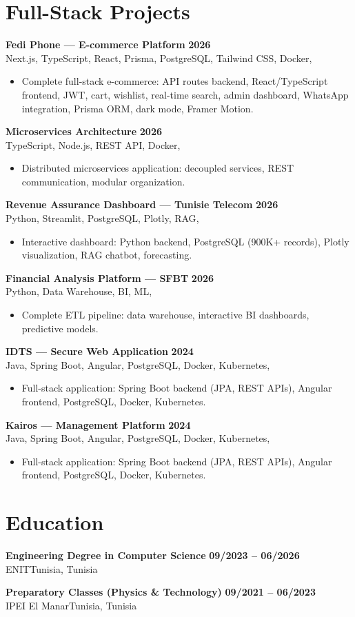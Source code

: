 \documentclass[a4paper,10pt]{article}
\newcommand{\cventry}[4]{\textbf{#1} \hfill \textbf{#4}\\[1pt]#2{\ifx\relax#3\relax\else, #3\fi}\par\vspace{1pt}}
\begin{document}
\section{Full-Stack Projects}
\cventry{Fedi Phone --- E-commerce Platform}{Next.js, TypeScript, React, Prisma, PostgreSQL, Tailwind CSS, Docker}{}{2026}
\begin{itemize}
  \item Complete full-stack e-commerce: API routes backend, React/TypeScript frontend, JWT, cart, wishlist, real-time search, admin dashboard, WhatsApp integration, Prisma ORM, dark mode, Framer Motion.
\end{itemize}
\cventry{Microservices Architecture}{TypeScript, Node.js, REST API, Docker}{}{2026}
\begin{itemize}
  \item Distributed microservices application: decoupled services, REST communication, modular organization.
\end{itemize}
\cventry{Revenue Assurance Dashboard --- Tunisie Telecom}{Python, Streamlit, PostgreSQL, Plotly, RAG}{}{2026}
\begin{itemize}
  \item Interactive dashboard: Python backend, PostgreSQL (900K+ records), Plotly visualization, RAG chatbot, forecasting.
\end{itemize}
\cventry{Financial Analysis Platform --- SFBT}{Python, Data Warehouse, BI, ML}{}{2026}
\begin{itemize}
  \item Complete ETL pipeline: data warehouse, interactive BI dashboards, predictive models.
\end{itemize}
\cventry{IDTS --- Secure Web Application}{Java, Spring Boot, Angular, PostgreSQL, Docker, Kubernetes}{}{2024}
\begin{itemize}
  \item Full-stack application: Spring Boot backend (JPA, REST APIs), Angular frontend, PostgreSQL, Docker, Kubernetes.
\end{itemize}
\cventry{Kairos --- Management Platform}{Java, Spring Boot, Angular, PostgreSQL, Docker, Kubernetes}{}{2024}
\begin{itemize}
  \item Full-stack application: Spring Boot backend (JPA, REST APIs), Angular frontend, PostgreSQL, Docker, Kubernetes.
\end{itemize}
\section{Education}
\cventry{Engineering Degree in Computer Science}{ENIT}{Tunisia}{09/2023 -- 06/2026}
\cventry{Preparatory Classes (Physics \& Technology)}{IPEI El Manar}{Tunisia}{09/2021 -- 06/2023}
\end{document}
